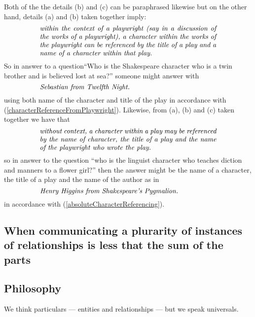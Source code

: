 \mynote %
Both of the the details (b) and (c) can be paraphrased likewise but
on the other hand, details (a) and (b) taken together imply: 
\begin{equation}
\label{characterReferenceFromPlaywright}
\text{\parbox{9cm}{\textit{within the context of a playwright
(say in a discussion of the works of a playwright), 
a character within the works of the playwright 
can be referenced by the title of a play 
and a name of a character within that play. }}}\\
\end{equation}
So in answer to a question``Who is the Shakespeare character who is a twin brother and is believed lost at sea?''
someone might answer with 
\begin{equation*}
\label{antonioReferenceFromPlaywright}
\text{\parbox{9cm}{\textit{Sebastian from Twelfth Night. }}}\\
\end{equation*}
using both name of the character and title of the play in accordance with (\ref{characterReferenceFromPlaywright}).
\mynote 
Likewise, from (a), (b) and (c) taken together we have that
\begin{equation} 
\label{absoluteCharacterReferencing}
\text{\parbox{9cm}{\textit{without context, a character within a play 
may be referenced by the name of character, the title of a play and the name of the playwright who wrote the play.}}}
\end{equation}
so in answer to the question ``who is the linguist character who teaches diction and manners to a flower girl?''
 then the answer might be the name of a character, the title of a play and the name of the author as in 
 \begin{equation*}
\label{HenryHigginsReferenceFromAbsolute}
\text{\parbox{9cm}{\textit{Henry Higgins from Shakespeare's Pygmalion. }}}\\
\end{equation*}
in accordance with (\ref{absoluteCharacterReferencing}).

\subsection{When communicating a plurarity of instances of relationships is less that the sum of the parts }
\subsection{Philosophy}
We think particulars --- entities and relationships --- but we speak universals.

